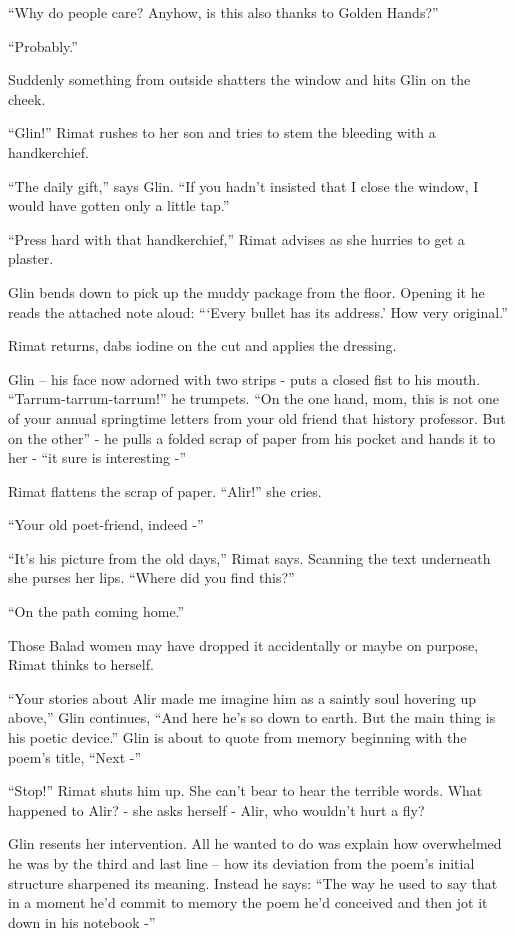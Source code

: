 \documentclass[twoside,11pt]{book}
\begin{document}
``Why do people care? Anyhow, is this also
thanks to Golden
Hands?''

``Probably.''

Suddenly something from outside shatters the window and hits Glin on
the cheek.

``Glin!'' Rimat rushes to her son and tries to stem the bleeding
with a handkerchief.

``The daily gift,'' says Glin. ``If you hadn't insisted that
I close the window, I would have gotten only a little
tap.''

``Press hard with that
handkerchief,'' Rimat advises as she hurries to get
a plaster.

Glin bends down to pick up the muddy
package from the floor. Opening it he reads the attached note aloud:
``{`Every bullet has its address.'} How very
original.''

Rimat returns, dabs iodine on the cut and applies the
dressing.

Glin -- his face now adorned with two strips
- puts a closed fist
to his mouth. ``Tarrum-tarrum-tarrum!'' he trumpets. ``On the
one hand, mom, this is not one of your annual springtime letters from
your old friend that history professor. But on the
other'' - he pulls a folded scrap of paper from his pocket and hands it to her
- ``it sure is interesting -''

Rimat flattens the scrap of paper. ``Alir!'' she cries.

``Your old poet-friend, indeed -''

``It's his picture from the old days,'' Rimat says. Scanning the
text underneath she purses her lips. ``Where did you find this?''

``On the path coming home.''

Those Balad women may have dropped it accidentally or maybe on purpose, Rimat thinks to
herself.

``Your stories about Alir made me imagine him as a
saintly soul hovering up above,'' Glin continues, ``And here he's so down to earth. But the
main thing is his poetic device.'' Glin is about to quote from memory beginning with the poem's title, ``Next -''

``Stop!'' Rimat shuts him
up. She can't bear to hear the terrible words. What happened to Alir?
- she asks herself - Alir, who wouldn't  hurt a fly?

Glin resents her intervention. All he wanted to do
was explain how overwhelmed he was by the third and last line -- how
its deviation from the poem's initial structure sharpened its meaning. Instead he says: ``The way he used to say that
in a moment he'd commit to memory the poem he'd conceived and then
jot it down in his notebook -''
\end{document}
